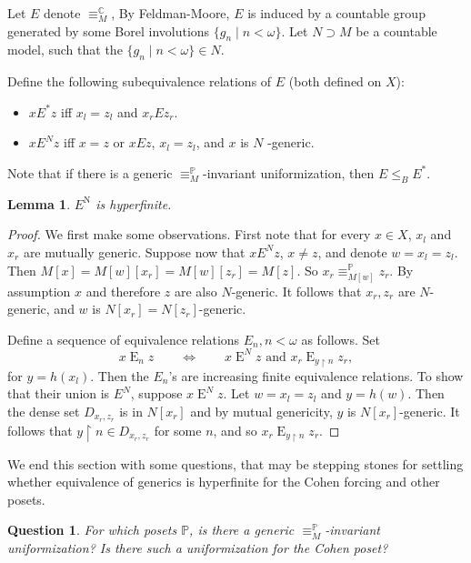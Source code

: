 \documentclass{amsart}
\newenvironment{itemizenew}{\begin{itemize}[leftmargin=2pc]}{\end{itemize}}
\newtheorem{lemma}[theorem]{Lemma}
\newtheorem{question}[theorem]{Question}
\theoremstyle{definition}
\theoremstyle{remark}
\begin{document}
Let \(E\) denote \(\equiv_M^{\mathbb{C}}\), By Feldman-Moore, $E$ is induced by a countable group generated by some Borel involutions $\{g_n\mid n<\omega\}$. Let $N\supset M$ be a countable model, such that the
$\{g_n\mid n<\omega\}\in N$.

Define the following  subequivalence relations of $E$ (both defined on $X$):
\begin{itemizenew}
\item 
$x\mathbin{E^*}z$ iff $x_l=z_l$ and $x_r E z_r$. 
\item
$x E^N z$ iff $x=z$ or
$x Ez$,  $x_l=z_l$, and $x$ is $N$ -generic.
\end{itemizenew}
Note that if there is a generic \(\equiv_M^\mathbb{P}\)-invariant uniformization, then $E\leq_B E^*$. 


\begin{lemma}
$E^{\text{N}}$ is hyperfinite.
\end{lemma}
\begin{proof}
We first make some observations. First note that for every $x\in X$, $x_l$ and $x_r$ are mutually generic. Suppose now that $xE^N z$, $x\neq z$, and denote $w=x_l=z_l$. Then $M[x] = M[w][x_r]=M[w][z_r]=M[z]$. So $x_r \equiv_{M[w]}^{\mathbb{P}}z_r$. By assumption $x$ and therefore $z$ are also $N$-generic. It follows that $x_r, z_r$ are $N$-generic, and $w$ is $N[x_r] = N[z_r]$-generic.


Define a sequence of equivalence relations $E_n, n<\omega$ as follows. Set 
\[x\mathbin{E}_n z \qquad\iff\qquad x\mathbin{E}^Nz \text{ and }x_r \mathbin{E}_{y\upharpoonright n} z_r,\]
for \(y=h(x_l)\).
Then the \(E_n\)'s are increasing finite equivalence relations. To show that their union is $E^N$, suppose $x\mathbin{E}^Nz$. Let   $w=x_l=z_l$ and $y=h(w)$. Then the dense set $D_{x_r, z_r}$ is in $N[x_r]$ and by mutual genericity, $y$ is $N[x_r]$-generic. It follows that  $y\upharpoonright n\in D_{x_r, z_r}$ for some $n$, and so $x_r \mathbin{E}_{y\upharpoonright n} z_r$.
\end{proof}


We end this section with some questions, that may be stepping stones for settling whether equivalence of generics is hyperfinite for the Cohen forcing and other posets.

\begin{question}
    For which posets $\mathbb{P}$, is there a generic \(\equiv^\mathbb{P}_M\)-invariant uniformization? Is there such a uniformization for the Cohen poset?
\end{question}
\end{document}
